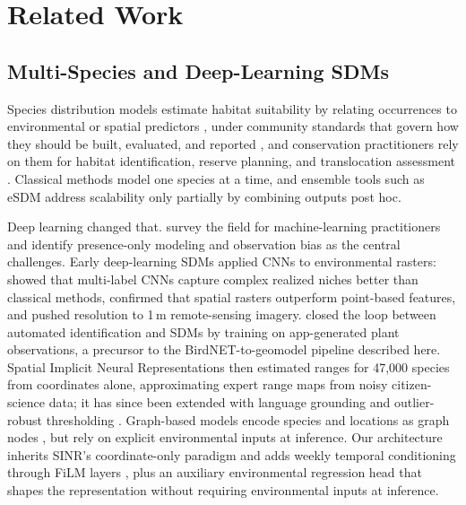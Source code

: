 \section{Related Work}
\label{sec:related}

\subsection{Multi-Species and Deep-Learning SDMs}
\label{sec:related-sdm}

Species distribution models estimate habitat suitability by relating occurrences to environmental or spatial predictors \citep{elith2009species}, under community standards that govern how they should be built, evaluated, and reported \citep{araujo2019standards}, and conservation practitioners rely on them for habitat identification, reserve planning, and translocation assessment \citep{guisan2013predicting}. Classical methods model one species at a time, and ensemble tools such as eSDM \citep{woodman2019esdm} address scalability only partially by combining outputs post hoc.

Deep learning changed that. \citet{beery2021sdmreview} survey the field for machine-learning practitioners and identify presence-only modeling and observation bias as the central challenges. Early deep-learning SDMs applied CNNs to environmental rasters: \citet{botella2018deep} showed that multi-label CNNs capture complex realized niches better than classical methods, \citet{deneu2021convolutional} confirmed that spatial rasters outperform point-based features, and \citet{deneu2022very} pushed resolution to 1\,m remote-sensing imagery. \citet{botella2018species} closed the loop between automated identification and SDMs by training on app-generated plant observations, a precursor to the BirdNET-to-geomodel pipeline described here. Spatial Implicit Neural Representations \citep{cole2023spatial} then estimated ranges for 47,000 species from coordinates alone, approximating expert range maps from noisy citizen-science data; it has since been extended with language grounding \citep{hamilton2024combining} and outlier-robust thresholding \citep{dorm2024generating}. Graph-based models encode species and locations as graph nodes \citep{harrell2025heterogeneous,wu2025gnn}, but rely on explicit environmental inputs at inference. Our architecture inherits SINR's coordinate-only paradigm and adds weekly temporal conditioning through FiLM layers \citep{perez2018film}, plus an auxiliary environmental regression head that shapes the representation without requiring environmental inputs at inference.

